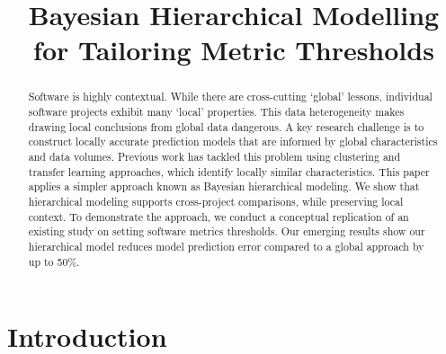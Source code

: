 \documentclass[sigconf,natbib=false]{acmart}
\begin{document}
\title{Bayesian Hierarchical Modelling for Tailoring  Metric Thresholds} %



\begin{abstract}
Software is highly contextual. While there are cross-cutting `global' lessons, individual software projects exhibit many `local' properties. This data heterogeneity makes drawing local conclusions from global data dangerous. %
A key research challenge is to construct locally accurate prediction models that are informed by global characteristics and data volumes. Previous work has tackled this problem using clustering and transfer learning approaches, which identify locally similar characteristics. This paper applies a simpler approach known as Bayesian hierarchical modeling. We show that hierarchical modeling supports cross-project comparisons, while preserving local context. To demonstrate the approach, we conduct a conceptual replication of an existing study on setting software metrics thresholds. Our emerging results show our hierarchical model reduces model prediction error compared to a global approach by up to 50\%.
\end{abstract}

%



\maketitle


\section{Introduction}
\end{document}
